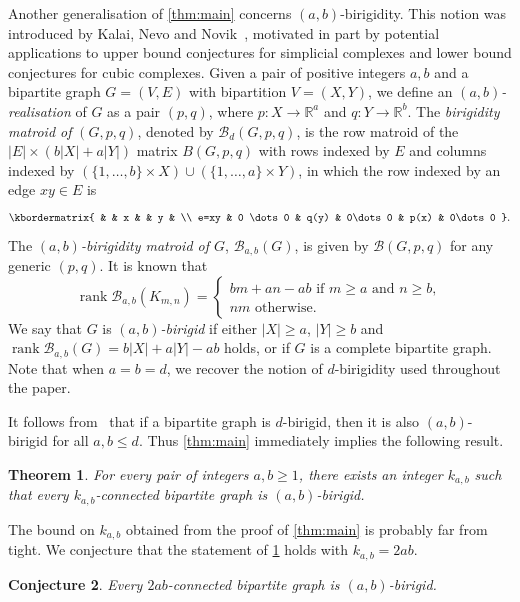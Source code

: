 \documentclass[11pt,a4paper,dvipsnames]{scrartcl}
\newtheorem{theorem}{Theorem}[section]
\newtheorem{conjecture}[theorem]{Conjecture}
\newcommand{\R}{{\mathbb{R}}}
\newcommand{\cB}{{\mathcal{B}}}
\DeclareMathOperator{\rank}{rank}
\begin{document}
Another generalisation of \cref{thm:main} concerns {$(a,b)$-birigidity}. 
This notion was introduced by Kalai, Nevo and Novik~\cite{KNN}, motivated in part by potential applications to upper bound conjectures for simplicial complexes and lower bound conjectures for cubic complexes. %
Given a pair of positive integers $a,b$ and a bipartite graph $G = (V,E)$ with bipartition $V = (X,Y)$, we define an \emph{$(a,b)$-realisation} of $G$ as a pair $(p,q)$, where $p : X \to \R^a$ and $q : Y \to \R^b$. The {\em  birigidity matroid of} $(G,p,q)$, denoted by $\cB_d(G,p,q)$, is the row matroid of the $|E|\times (b|X|+a|Y|)$ matrix $B(G,p,q)$ with rows indexed by $E$ and columns indexed by $(\{1,\ldots,b\} \times X) \cup (\{1,\ldots,a\} \times Y)$, in which the row indexed by an edge $xy\in E$ is 
\vspace{-.5em}
\[
\kbordermatrix{
& &  x & & y & \\
e=xy & 0 \dots 0 & q(y) & 0\dots 0 & p(x) & 0\dots 0
}.
\]
The {\em $(a,b)$-birigidity matroid of $G$}, $\cB_{a,b}(G)$, is given by $\cB(G,p,q)$ for any generic $(p,q)$. It is known that
\[
\rank \cB_{a,b}(K_{m,n})=\begin{cases}
    bm+an-ab \mbox{ if $m\geq a$ and $n\geq b$},\\  
    nm \mbox{  otherwise}.
\end{cases}
\]
We say that $G$ is \emph{$(a,b)$-birigid} if either $|X| \geq a$, $|Y| \geq b$ and $\rank \cB_{a,b}(G) = b|X| + a|Y| - ab$ holds,
or if $G$ is a complete bipartite graph. Note that when $a=b=d$, we recover the notion of $d$-birigidity used throughout the paper.

It follows from~\cite[Lemma 3.12]{KNN} that if a bipartite graph is $d$-birigid, then it is also $(a,b)$-birigid for all $a,b \leq d$. Thus \cref{thm:main} immediately implies the following result.

\begin{theorem}\label{theorem:abrigid}
    For every pair of integers $a,b \geq 1$, there exists an integer $k_{a,b}$ such that every $k_{a,b}$-connected bipartite graph is $(a,b)$-birigid.
\end{theorem}

The bound on $k_{a,b}$ obtained from 
the proof of \cref{thm:main} is probably far from tight. We conjecture that the statement of \cref{theorem:abrigid} holds with $k_{a,b} = 2ab$.

\begin{conjecture}\label{conjecture:abrigid}
    Every $2ab$-connected bipartite graph is $(a,b)$-birigid.
\end{conjecture}
\end{document}
